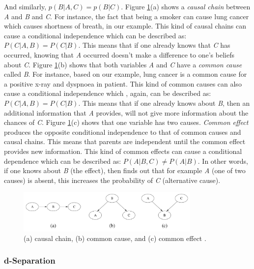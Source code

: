 \documentclass[11pt]{article}
\begin{document}
\noindent And similarly, $p(B|A,C) = p(B|C)$. Figure
\ref{fig:conditional-independence}(a) shows a \textit{causal chain} between
\textit{A} and \textit{B} and \textit{C}. For instance, the fact that being a
smoker can cause lung cancer which causes shortness of breath, in our example.
This kind of causal chains can cause a conditional independence which can be
described as: $P(C|A,B) = P(C|B)$. This means that if one already knows that
\textit{C} has occurred, knowing that \textit{A} occurred doesn’t make a
difference to one's beliefs about \textit{C}. Figure
\ref{fig:conditional-independence}(b) shows that both variables \textit{A} and
\textit{C} have a \textit{common cause} called \textit{B}. For instance, based
on our example, lung cancer is a common cause for a positive x-ray and dyspnoea
in patient. This kind of common causes can also cause a conditional independence
which , again, can be described as: $P(C|A,B) = P(C|B)$. This means that if one
already knows about \textit{B}, then an additional information that \textit{A}
provides, will not give more information about the chances of \textit{C}. Figure
\ref{fig:conditional-independence}(c) shows that one variable has two causes.
\textit{Common effect} produces the opposite conditional independence to that of
common causes and causal chains. This means that parents are independent until
the common effect provides new information. This kind of common effects can
cause a conditional dependence which can be described as: $P(A|B,C) \neq
P(A|B)$. In other words, if one knows about \textit{B} (the effect), then finds
out that for example \textit{A} (one of two causes) is absent, this increases
the probability of \textit{C} (alternative cause).

\begin{figure}[tbh]
  \center
  \includegraphics[width=0.8\textwidth]{figure/conditional-independence.png}
  \caption{(a) causal chain, (b) common cause, and (c) common effect
  \cite{korb:bayesian-ai}.}
  \label{fig:conditional-independence}
\end{figure}

\subsubsection{d-Separation}
\end{document}
